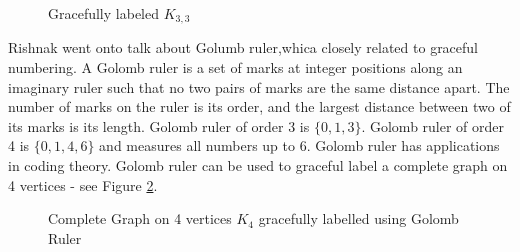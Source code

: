 \begin{figure}
\begin{center}

\caption{Gracefully labeled $K_{3,3}$}\label{18g45}
\end{center}
\end{figure}
Rishnak went onto talk about Golumb ruler,whica closely related to graceful numbering.  A Golomb ruler is a set of marks at integer positions along an imaginary ruler such that no two pairs of marks are the same distance apart. The number of marks on the ruler is its order, and the largest distance between two of its marks is its length.
Golomb ruler of order 3 is $\{0,1,3\}$. Golomb ruler of order 4 is $\{0,1,4,6\}$ and measures all numbers up to 6. Golomb ruler has applications in coding theory. Golomb ruler can be used to graceful label a complete graph on 4 vertices - see Figure \ref{19g5}.
\begin{figure}
\begin{center}


\caption{Complete Graph on 4 vertices $K_4$ gracefully labelled using Golomb Ruler}\label{19g5}
\end{center}
\end{figure}

